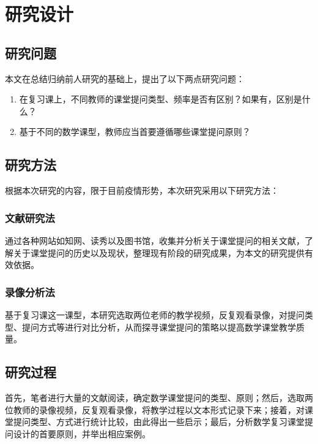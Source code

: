 \chapter{研究设计}


\section{研究问题}

本文在总结归纳前人研究的基础上，提出了以下两点研究问题：
\begin{enumerate}
  \item 在复习课上，不同教师的课堂提问类型、频率是否有区别？如果有，区别是什么？
  \item 基于不同的数学课型，教师应当首要遵循哪些课堂提问原则？
\end{enumerate}



\section{研究方法}

根据本次研究的内容，限于目前疫情形势，本次研究采用以下研究方法：


\subsection{文献研究法}

通过各种网站如知网、读秀以及图书馆，收集并分析关于课堂提问的相关文献，了解关于课堂提问的历史以及现状，整理现有阶段的研究成果，为本文的研究提供有效依据。


\subsection{录像分析法}

基于复习课这一课型，本研究选取两位老师的教学视频，反复观看录像，对提问类型、提问方式等进行对比分析，从而探寻课堂提问的策略以提高数学课堂教学质量。



\section{研究过程}

首先，笔者进行大量的文献阅读，确定数学课堂提问的类型、原则；然后，选取两位教师的录像视频，反复观看录像，将教学过程以文本形式记录下来；接着，对课堂提问类型、方式进行统计比较，由此得出一些启示；最后，分析数学复习课堂提问设计的首要原则，并举出相应案例。


